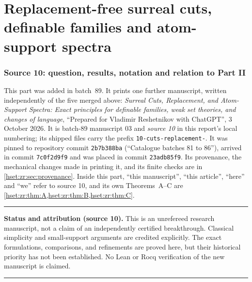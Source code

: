 \documentclass[11pt,letterpaper]{article}
\theoremstyle{definition}
\theoremstyle{remark}
\newenvironment{resultbox}{\par\medskip\noindent\begin{minipage}{\linewidth}\setlength{\parindent}{0pt}\hrule\medskip}{\medskip\hrule\end{minipage}\par\medskip}
\begin{document}
\part{Replacement-free surreal cuts, definable families and atom-support spectra}\label{hset:zr:part}

\section{Source 10: question, results, notation and relation to Part II}
\label{hset:zr:sec:overview}

This part was added in batch~89. It prints one further manuscript, written
independently of the five merged above:
\emph{Surreal Cuts, Replacement, and Atom-Support Spectra: Exact principles for
definable families, weak set theories, and changes of language}, ``Prepared for
Vladimir Reshetnikov with ChatGPT'', 3 October 2026. It is batch-89 manuscript
03 and \emph{source 10} in this report's local numbering; its shipped files
carry the prefix \texttt{10-cuts-replacement-}. It was pinned to repository
commit \texttt{2b7b388ba} (``Catalogue batches 81 to 86''), arrived in commit
\texttt{7c0f2d9f9} and was placed in commit \texttt{23adb85f9}. Its provenance,
the mechanical changes made in printing it, and its finite checks are in
\cref{hset:zr:sec:provenance}. Inside this part, ``this manuscript'', ``this
article'', ``here'' and ``we'' refer to source 10, and its own Theorems~A--C are
\cref{hset:zr:thm:A,hset:zr:thm:B,hset:zr:thm:C}.

\begin{resultbox}
\textbf{Status and attribution (source 10).} This is an unrefereed research
manuscript, not a claim of an independently certified breakthrough. Classical
simplicity and small-support arguments are credited explicitly. The exact
formulations, comparisons, and refinements are proved here, but their
historical priority has not been established. No Lean or Rocq verification of
the new manuscript is claimed.
\end{resultbox}
\end{document}
